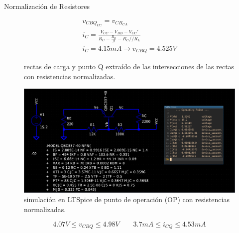 \begin{frame}[allowframebreaks]{Normalización de Resistores}
\begin{figure}[!h]
\begin{minipage}{0.45\textwidth}
\begin{tikzpicture}
      \end{tikzpicture}
    \end{minipage}
    \hfill
    \begin{minipage}{0.45\textwidth}
      \begin{gather*}
        v_{CBQ_{CC}} = v_{CB_{CA}}\\[6pt]
        i_C = \frac{V_{CC} - V_{BB} - V_{CC}'}{R_C - \frac{R_B}{\beta} - R_C // R_L}\\[6pt]
        i_C = 4.15mA \to v_{CBQ} = 4.525V
      \end{gather*}
    \end{minipage}
    \caption{rectas de carga y punto Q extraído de las intersecciones de las rectas con resistencias normalizadas.}
  \end{figure}

  \begin{figure}[!ht]
    \centering
    \includegraphics[width=.9\textwidth]{images/sim_normalizada.png}
    \caption{simulación en LTSpice de punto de operación (OP) con resistencias normalizadas.}
  \end{figure}
  \begin{equation*}
    4.07V \leq v_{CBQ} \leq 4.98V \quad \quad 3.7mA \leq i_{CQ} \leq 4.53mA
  \end{equation*}
\end{frame}


